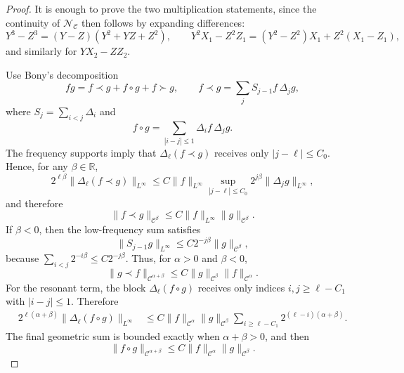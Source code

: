 \begin{proof}
It is enough to prove the two multiplication statements, since the
continuity of \(\mathcal N_{\mathcal C}\) then follows by expanding
differences:
\[
  Y^3-Z^3=(Y-Z)(Y^2+YZ+Z^2),
  \qquad
  Y^2X_1-Z^2Z_1=(Y^2-Z^2)X_1+Z^2(X_1-Z_1),
\]
and similarly for \(YX_2-ZZ_2\).

Use Bony's decomposition
\[
  fg=f\prec g+f\circ g+f\succ g,
  \qquad
  f\prec g=\sum_j S_{j-1}f\,\Delta_jg ,
\]
where \(S_j=\sum_{i<j}\Delta_i\) and
\[
  f\circ g=\sum_{|i-j|\leq1}\Delta_if\,\Delta_jg .
\]
The frequency supports imply that \(\Delta_\ell(f\prec g)\) receives only
\(|j-\ell|\leq C_0\).  Hence, for any \(\beta\in\mathbb R\),
\[
  2^{\ell\beta}\|\Delta_\ell(f\prec g)\|_{L^\infty}
  \leq
  C\|f\|_{L^\infty}
  \sup_{|j-\ell|\leq C_0}
  2^{j\beta}\|\Delta_jg\|_{L^\infty},
\]
and therefore
\begin{equation}
  \|f\prec g\|_{\mathcal C^\beta}
  \leq
  C\|f\|_{L^\infty}\|g\|_{\mathcal C^\beta}.
  \label{eq:spde-besov-left-paraproduct}
\end{equation}
If \(\beta<0\), then the low-frequency sum satisfies
\[
  \|S_{j-1}g\|_{L^\infty}
  \leq
  C2^{-j\beta}\|g\|_{\mathcal C^\beta},
\]
because \(\sum_{i<j}2^{-i\beta}\leq C2^{-j\beta}\).  Thus, for
\(\alpha>0\) and \(\beta<0\),
\begin{equation}
  \|g\prec f\|_{\mathcal C^{\alpha+\beta}}
  \leq
  C\|g\|_{\mathcal C^\beta}\|f\|_{\mathcal C^\alpha}.
  \label{eq:spde-besov-right-paraproduct}
\end{equation}
For the resonant term, the block \(\Delta_\ell(f\circ g)\) receives only
indices \(i,j\geq \ell-C_1\) with \(|i-j|\leq1\).  Therefore
\[
\begin{aligned}
  2^{\ell(\alpha+\beta)}
  \|\Delta_\ell(f\circ g)\|_{L^\infty}
  &\leq
  C\|f\|_{\mathcal C^\alpha}\|g\|_{\mathcal C^\beta}
  \sum_{i\geq \ell-C_1}2^{(\ell-i)(\alpha+\beta)} .
\end{aligned}
\]
The final geometric sum is bounded exactly when \(\alpha+\beta>0\), and
then
\begin{equation}
  \|f\circ g\|_{\mathcal C^{\alpha+\beta}}
  \leq
  C\|f\|_{\mathcal C^\alpha}\|g\|_{\mathcal C^\beta}.
  \label{eq:spde-besov-resonant-product}
\end{equation}


\end{proof}
